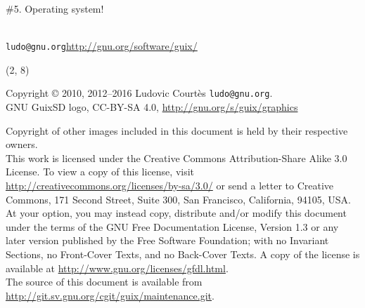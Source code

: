 \documentclass{beamer}
\begin{document}
\begin{frame}[plain]
  \Huge{\#5. Operating system!}
\end{frame}

\begin{frame}[plain]

\vfill{
  \vspace{2.5cm}
  \\[1.0cm]
  \texttt{ludo@gnu.org}\hfill{\alert{\url{http://gnu.org/software/guix/}}}
}

\end{frame}

\begin{frame}{}

  \begin{textblock}{12}(2, 8)
    \tiny{
      Copyright \copyright{} 2010, 2012--2016 Ludovic Courtès \texttt{ludo@gnu.org}.\\[3.0mm]
      GNU GuixSD logo, CC-BY-SA 4.0, \url{http://gnu.org/s/guix/graphics}

      Copyright of other images included in this document is held by
      their respective owners.
      \\[3.0mm]
      This work is licensed under the \alert{Creative Commons
        Attribution-Share Alike 3.0} License.  To view a copy of this
      license, visit
      \url{http://creativecommons.org/licenses/by-sa/3.0/} or send a
      letter to Creative Commons, 171 Second Street, Suite 300, San
      Francisco, California, 94105, USA.
      \\[2.0mm]
      At your option, you may instead copy, distribute and/or modify
      this document under the terms of the \alert{GNU Free Documentation
        License, Version 1.3 or any later version} published by the Free
      Software Foundation; with no Invariant Sections, no Front-Cover
      Texts, and no Back-Cover Texts.  A copy of the license is
      available at \url{http://www.gnu.org/licenses/gfdl.html}.
      \\[2.0mm]
      The source of this document is available from
      \url{http://git.sv.gnu.org/cgit/guix/maintenance.git}.
    }
  \end{textblock}
\end{frame}
\end{document}
